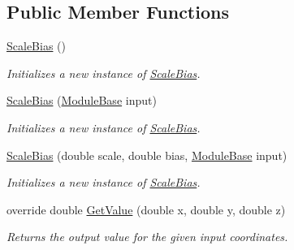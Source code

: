 \subsection*{Public Member Functions}
\begin{DoxyCompactItemize}
\item 
\hyperlink{class_lib_noise_1_1_operator_1_1_scale_bias_aa1d2fe3d33ddc751071b19a7965ab400}{Scale\+Bias} ()
\begin{DoxyCompactList}\small\item\em Initializes a new instance of \hyperlink{class_lib_noise_1_1_operator_1_1_scale_bias}{Scale\+Bias}. \end{DoxyCompactList}\item 
\hyperlink{class_lib_noise_1_1_operator_1_1_scale_bias_a24ea8f69951c50dafad424b08b56c02c}{Scale\+Bias} (\hyperlink{class_lib_noise_1_1_module_base}{Module\+Base} input)
\begin{DoxyCompactList}\small\item\em Initializes a new instance of \hyperlink{class_lib_noise_1_1_operator_1_1_scale_bias}{Scale\+Bias}. \end{DoxyCompactList}\item 
\hyperlink{class_lib_noise_1_1_operator_1_1_scale_bias_abdb67954855a2d39754ec40cd782f3c0}{Scale\+Bias} (double scale, double bias, \hyperlink{class_lib_noise_1_1_module_base}{Module\+Base} input)
\begin{DoxyCompactList}\small\item\em Initializes a new instance of \hyperlink{class_lib_noise_1_1_operator_1_1_scale_bias}{Scale\+Bias}. \end{DoxyCompactList}\item 
override double \hyperlink{class_lib_noise_1_1_operator_1_1_scale_bias_a9a166fa396cba8b414da3811695c07cf}{Get\+Value} (double x, double y, double z)
\begin{DoxyCompactList}\small\item\em Returns the output value for the given input coordinates. \end{DoxyCompactList}\end{DoxyCompactItemize}
